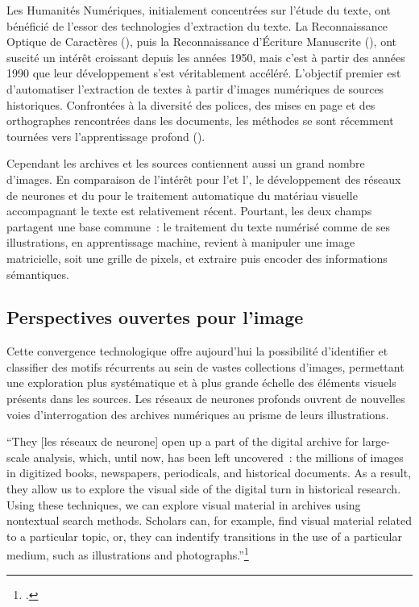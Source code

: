 Les Humanités Numériques, initialement concentrées sur l'étude du texte, ont bénéficié de l'essor des technologies d'extraction du texte. La Reconnaissance Optique de Caractères (\ocr), puis la Reconnaissance d'Écriture Manuscrite (\htr), ont suscité un intérêt croissant depuis les années 1950, mais c'est à partir des années 1990 que leur développement s'est véritablement accéléré. L'objectif premier est d'automatiser l'extraction de textes à partir d'images numériques de sources historiques. Confrontées à la diversité des polices, des mises en page et des orthographes rencontrées dans les documents, les méthodes se sont récemment tournées vers l'apprentissage profond (\dl). 

Cependant les archives et les sources contiennent aussi un grand nombre d'images. En comparaison de l'intérêt pour l'\htr et l'\ocr, le développement des réseaux de neurones et du \ml pour le traitement automatique du matériau visuelle accompagnant le texte est relativement récent. Pourtant, les deux champs partagent une base commune~: le traitement du texte numérisé comme de ses illustrations, en apprentissage machine, revient à manipuler une image matricielle, soit une grille de pixels, et extraire puis encoder des informations sémantiques. 

\subsection{Perspectives ouvertes pour l'image}

Cette convergence technologique offre aujourd'hui la possibilité d'identifier et classifier des motifs récurrents au sein de vastes collections d'images, permettant une exploration plus systématique et à plus grande échelle des éléments visuels présents dans les sources. Les réseaux de neurones profonds ouvrent de nouvelles voies d'interrogation des archives numériques au prisme de leurs illustrations. 

\begin{kwote}
``They [les réseaux de neurone] open up a part of the digital archive for large-scale analysis, which, until now, has been left uncovered~: the millions of images in digitized books, newspapers, periodicals, and historical documents. As a result, they allow us to explore the visual side of the digital turn in historical research. Using these techniques, we can explore visual material in archives using nontextual search methods. Scholars can, for example, find visual material related to a particular topic, or, they can indentify transitions in the use of a particular medium, such as illustrations and photographs.''\footcite[p.2]{wevers_visual_2020}
\end{kwote}

